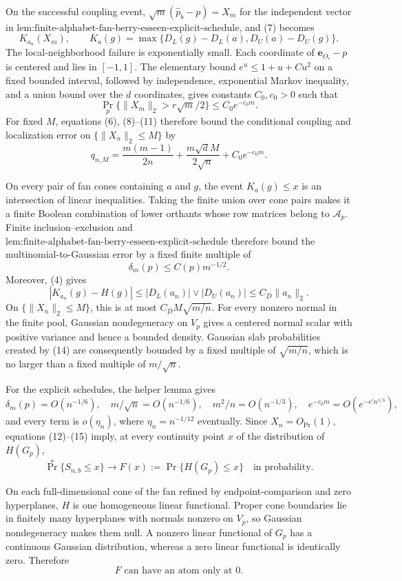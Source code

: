 On the successful coupling event, \(\sqrt m(\widehat p_b-p)=X_m\) for the independent vector in \(\text{lem:finite-alphabet-fan-berry-esseen-explicit-schedule}\), and (7) becomes
\[
K_{a_n}(X_m),
\qquad
K_a(g)=\max\{D_L(g)-D_L(a),D_U(a)-D_U(g)\}.
\tag{10}
\]
The local-neighborhood failure is exponentially small.  Each coordinate of \(\mathbf e_{O_i}-p\) is centered and lies in \([-1,1]\).  The elementary bound \(e^u\leq1+u+C u^2\) on a fixed bounded interval, followed by independence, exponential Markov inequality, and a union bound over the \(d\) coordinates, gives constants \(C_0,c_0>0\) such that
\[
\Pr_p\{\|X_m\|_2>r\sqrt m/2\}\leq C_0e^{-c_0m}.
\tag{11}
\]
For fixed \(M\), equations (6), (8)--(11) therefore bound the conditional coupling and localization error on \(\{\|X_n\|_2\leq M\}\) by
\[
q_{n,M}=\frac{m(m-1)}{2n}+\frac{m\sqrt d M}{2\sqrt n}+C_0e^{-c_0m}.
\tag{12}
\]

On every pair of fan cones containing \(a\) and \(g\), the event \(K_a(g)\leq x\) is an intersection of linear inequalities.  Taking the finite union over cone pairs makes it a finite Boolean combination of lower orthants whose row matrices belong to \(\mathcal A_p\).  Finite inclusion--exclusion and \(\text{lem:finite-alphabet-fan-berry-esseen-explicit-schedule}\) therefore bound the multinomial-to-Gaussian error by a fixed finite multiple of
\[
\delta_m(p)\leq C(p)m^{-1/2}.
\tag{13}
\]
Moreover, (4) gives
\[
|K_{a_n}(g)-H(g)|
\leq |D_L(a_n)|\vee|D_U(a_n)|
\leq C_D\|a_n\|_2.
\tag{14}
\]
On \(\{\|X_n\|_2\leq M\}\), this is at most \(C_D M\sqrt{m/n}\).  For every nonzero normal in the finite pool, Gaussian nondegeneracy on \(V_p\) gives a centered normal scalar with positive variance and hence a bounded density.  Gaussian slab probabilities created by (14) are consequently bounded by a fixed multiple of \(\sqrt{m/n}\), which is no larger than a fixed multiple of \(m/\sqrt n\).

For the explicit schedules, the helper lemma gives
\[
\delta_m(p)=O(n^{-1/6}),\quad
m/\sqrt n=O(n^{-1/6}),\quad
m^2/n=O(n^{-1/3}),\quad
e^{-c_0m}=O(e^{-c'n^{1/3}}),
\tag{15}
\]
and every term is \(o(\eta_n)\), where \(\eta_n=n^{-1/12}\) eventually.  Since \(X_n=O_{\Pr}(1)\), equations (12)--(15) imply, at every continuity point \(x\) of the distribution of \(H(G_p)\),
\[
\Pr^*\{S_{n,b}\leq x\}\longrightarrow
F(x):=\Pr\{H(G_p)\leq x\}
\quad\text{in probability}.
\tag{16}
\]

On each full-dimensional cone of the fan refined by endpoint-comparison and zero hyperplanes, \(H\) is one homogeneous linear functional.  Proper cone boundaries lie in finitely many hyperplanes with normals nonzero on \(V_p\), so Gaussian nondegeneracy makes them null.  A nonzero linear functional of \(G_p\) has a continuous Gaussian distribution, whereas a zero linear functional is identically zero.  Therefore
\[
F\text{ can have an atom only at }0.
\tag{17}
\]

